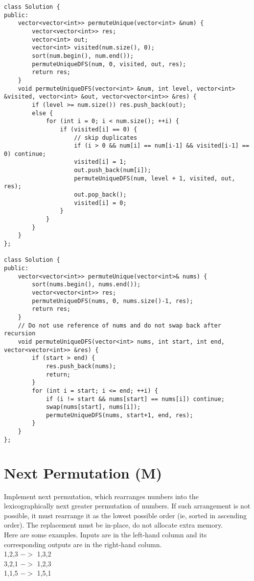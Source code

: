 \begin{lstlisting}
class Solution {
public:
    vector<vector<int>> permuteUnique(vector<int> &num) {
        vector<vector<int>> res;
        vector<int> out;
        vector<int> visited(num.size(), 0);
        sort(num.begin(), num.end());
        permuteUniqueDFS(num, 0, visited, out, res);
        return res;
    }
    void permuteUniqueDFS(vector<int> &num, int level, vector<int> &visited, vector<int> &out, vector<vector<int>> &res) {
        if (level >= num.size()) res.push_back(out);
        else {
            for (int i = 0; i < num.size(); ++i) {
                if (visited[i] == 0) {
                    // skip duplicates
                    if (i > 0 && num[i] == num[i-1] && visited[i-1] == 0) continue;
                    visited[i] = 1;
                    out.push_back(num[i]);
                    permuteUniqueDFS(num, level + 1, visited, out, res);
                    out.pop_back();
                    visited[i] = 0;
                }
            }
        }
    }
};

class Solution {
public:
    vector<vector<int>> permuteUnique(vector<int>& nums) {
        sort(nums.begin(), nums.end());
        vector<vector<int>> res;
        permuteUniqueDFS(nums, 0, nums.size()-1, res);
        return res;
    }
    // Do not use reference of nums and do not swap back after recursion
    void permuteUniqueDFS(vector<int> nums, int start, int end, vector<vector<int>> &res) {
        if (start > end) {
            res.push_back(nums);
            return;
        }
        for (int i = start; i <= end; ++i) {
            if (i != start && nums[start] == nums[i]) continue;
            swap(nums[start], nums[i]);
            permuteUniqueDFS(nums, start+1, end, res);
        }
    }
};
\end{lstlisting}


\section{Next Permutation (M)}
Implement next permutation, which rearranges numbers into the lexicographically next greater permutation of numbers. If such arrangement is not possible, it must rearrange it as the lowest possible order (ie, sorted in ascending order). The replacement must be in-place, do not allocate extra memory.\\

Here are some examples. Inputs are in the left-hand column and its corresponding outputs are in the right-hand column.\\
1,2,3 $->$ 1,3,2\\
3,2,1 $->$ 1,2,3\\
1,1,5 $->$ 1,5,1\\

